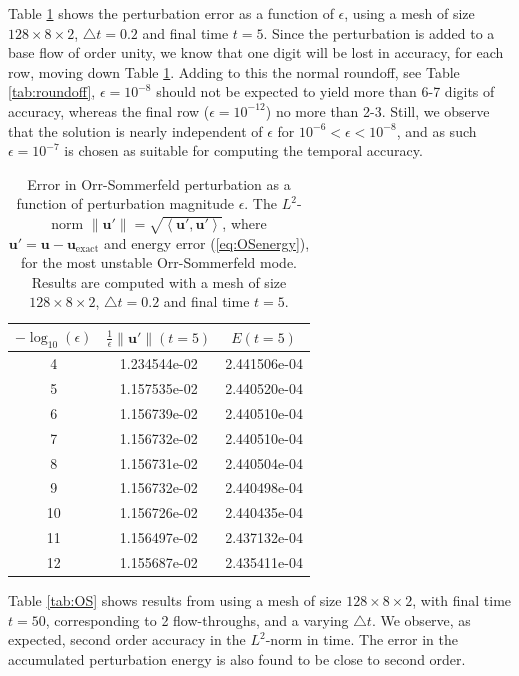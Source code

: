 \documentclass[preprint]{elsarticle}
\begin{document}
Table \ref{tab:epsilon} shows the perturbation error as a function of $\epsilon$, using a mesh of size $128 \times 8 \times 2$, $\triangle t=0.2$ and final time $t=5$. Since the perturbation is added to a base flow of order unity, we know that one digit will be lost in accuracy, for each row, moving down Table \ref{tab:epsilon}. Adding to this the normal roundoff, see Table \ref{tab:roundoff}, $\epsilon=10^{-8}$ should not be expected to yield more than 6-7 digits of accuracy, whereas the final row ($\epsilon=10^{-12}$) no more than 2-3. Still, we observe that the solution is nearly independent of $\epsilon$ for $10^{-6} < \epsilon < 10^{-8}$, and as such $\epsilon=10^{-7}$ is chosen as suitable for computing the temporal accuracy.
\begin{table}
	\centering
	\caption{ Error in Orr-Sommerfeld perturbation as a function of perturbation magnitude $\epsilon$. The $L^2$-norm $ \| \bm{u}' \| = \sqrt{\left< \bm{u}', \bm{u}'\right>}$, where $\bm{u}'=\bm{u}-\bm{u}_{\mathrm{exact}}$ and energy error (\ref{eq:OSenergy}), for the most unstable Orr-Sommerfeld mode. Results are computed with a mesh of size $128 \times 8 \times 2$, $\triangle t=0.2$ and final time $t=5$. \label{tab:epsilon}}
	\begin{tabular}{ccc}	
		$-\log_{10}(\epsilon)$ & $\frac{1}{\epsilon}\| \bm{u}' \|(t=5)$ & $E(t=5)$ \\
		\hline
		4 & 1.234544e-02 & 2.441506e-04 \\ 
		5 & 1.157535e-02 & 2.440520e-04 \\ 
		6 & 1.156739e-02 & 2.440510e-04 \\ 
		7 & 1.156732e-02 & 2.440510e-04 \\ 
		8 & 1.156731e-02 & 2.440504e-04 \\ 
		9 & 1.156732e-02 & 2.440498e-04 \\ 
		10 & 1.156726e-02 & 2.440435e-04 \\ 
		11 & 1.156497e-02 & 2.437132e-04 \\ 
		12 & 1.155687e-02 & 2.435411e-04
	\end{tabular}
\end{table}

Table \ref{tab:OS} shows results from using a mesh of size $128 \times 8 \times 2$, with final time $t=50$, corresponding to 2 flow-throughs, and a varying $\triangle t$. We observe, as expected, second order accuracy in the $L^2$-norm in time. The error in the accumulated perturbation energy is also found to be close to second order.
\end{document}
